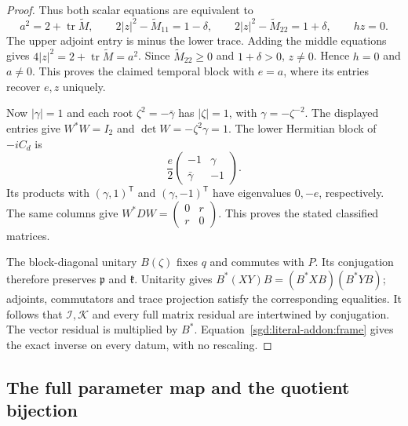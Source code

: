 \begin{proof}
Thus both scalar equations are equivalent to
\[
 a^2=2+\operatorname{tr}\widetilde M,\qquad
 2|z|^2-\widetilde M_{11}=1-\delta,\qquad
 2|z|^2-\widetilde M_{22}=1+\delta,\qquad hz=0.
\]
The upper adjoint entry is minus the lower trace.
Adding the middle equations gives
$4|z|^2=2+\operatorname{tr}\widetilde M=a^2$.
Since $\widetilde M_{22}\ge0$ and $1+\delta>0$, $z\ne0$.
Hence $h=0$ and $a\ne0$. This proves the claimed temporal block
with $e=a$, where its entries recover $e,z$ uniquely.

Now $|\gamma|=1$ and each root $\zeta^2=-\bar\gamma$ has
$|\zeta|=1$, with $\gamma=-\zeta^{-2}$. The displayed entries give
$W^*W=I_2$ and $\det W=-\zeta^2\gamma=1$.
The lower Hermitian block of $-iC_d$ is
\[
 \frac e2\begin{pmatrix}-1&\gamma\\\bar\gamma&-1\end{pmatrix}.
\]
Its products with $(\gamma,1)^{\mathsf T}$ and
$(\gamma,-1)^{\mathsf T}$ have eigenvalues $0,-e$,
respectively. The same columns give
$W^*DW=\left(\begin{smallmatrix}0&r\\r&0\end{smallmatrix}\right)$.
This proves the stated classified matrices.

The block-diagonal unitary $B(\zeta)$ fixes $q$ and commutes with
$P$. Its conjugation therefore preserves $\mathfrak p$ and
$\mathfrak k$. Unitarity gives
$B^*(XY)B=(B^*XB)(B^*YB)$; adjoints, commutators and trace
projection satisfy the corresponding equalities.
It follows that $\mathcal I,\mathcal K$ and every full matrix
residual are intertwined by conjugation. The vector residual is
multiplied by $B^*$. Equation~\eqref{sgd:literal-addon:frame} gives
the exact inverse on every datum, with no rescaling.
\end{proof}

\subsection{The full parameter map and the quotient bijection}

